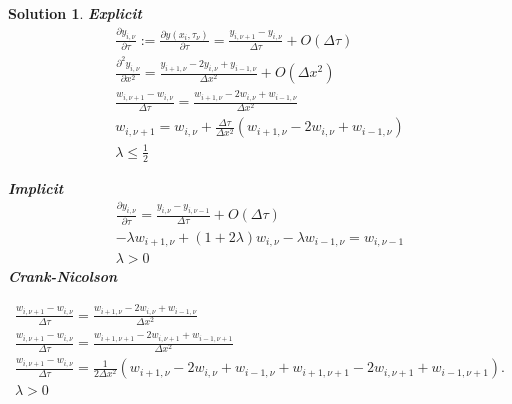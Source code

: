 \documentclass[16pt]{article}
\newtheorem{sol}{Solution}[section]
\begin{document}
		\begin{sol}
			\textbf{Explicit}
			\begin{eqnarray}
				\frac{\partial y_{i, \nu}}{\partial \tau}:=\frac{\partial y\left(x_{i}, \tau_{\nu}\right)}{\partial \tau}=\frac{y_{i, \nu+1}-y_{i, \nu}}{\Delta \tau}+O(\Delta \tau) \\
				\frac{\partial^{2} y_{i, \nu}}{\partial x^{2}}=\frac{y_{i+1, \nu}-2 y_{i, \nu}+y_{i-1, \nu}}{\Delta x^{2}}+O\left(\Delta x^{2}\right) \\
				\frac{w_{i, \nu+1}-w_{i, \nu}}{\Delta \tau}=\frac{w_{i+1, \nu}-2 w_{i, \nu}+w_{i-1, \nu}}{\Delta x^{2}} \\
				w_{i, \nu+1}=w_{i, \nu}+\frac{\Delta \tau}{\Delta x^{2}}\left(w_{i+1, \nu}-2 w_{i, \nu}+w_{i-1, \nu}\right) \\
				\lambda \le \frac{1}{2}
			\end{eqnarray}
		
			\textbf{Implicit}
			\begin{eqnarray}
				\frac{\partial y_{i, \nu}}{\partial \tau}=\frac{y_{i, \nu}-y_{i, \nu-1}}{\Delta \tau}+O(\Delta \tau) \\
				-\lambda w_{i+1, \nu}+(1+2 \lambda) w_{i, \nu}-\lambda w_{i-1, \nu}=w_{i, \nu-1} \\
				\lambda > 0
			\end{eqnarray}
			\textbf{Crank-Nicolson}
			
	
			\begin{eqnarray}
			\frac{w_{i, \nu+1}-w_{i, \nu}}{\Delta \tau}=\frac{w_{i+1, \nu}-2 w_{i, \nu}+w_{i-1, \nu}}{\Delta x^{2}} \\
			\frac{w_{i, \nu+1}-w_{i, \nu}}{\Delta \tau}=\frac{w_{i+1, \nu+1}-2 w_{i, \nu+1}+w_{i-1, \nu+1}}{\Delta x^{2}} \\
			\frac{w_{i, \nu+1}-w_{i, \nu}}{\Delta \tau}=\frac{1}{2 \Delta x^{2}}\left(w_{i+1, \nu}-2 w_{i, \nu}+w_{i-1, \nu}+w_{i+1, \nu+1}-2 w_{i, \nu+1}+w_{i-1, \nu+1}\right) . \\
			\lambda > 0
			\end{eqnarray}
			
		\end{sol}
	
\end{document}
